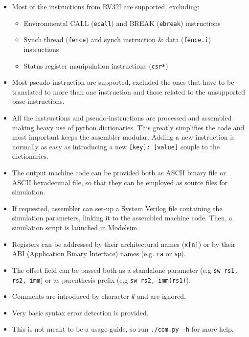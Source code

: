 \begin{itemize}
   \item Most of the instructions from RV32I are supported, excluding:
   \begin{itemize}
      \item Environmental CALL (\texttt{ecall}) and BREAK (\texttt{ebreak}) instructions
      \item Synch thread (\texttt{fence}) and synch instruction \& data (\texttt{fence.i}) instructions
      \item Status register manipulation instructions (\texttt{csr*})
   \end{itemize}
   \item Most pseudo-instruction are supported, excluded the ones that have to be translated to more than one instruction and those related to the unsupported base instructions.
   \item All the instructions and pseudo-instructions are processed and assembled making heavy use of python dictionaries. This greatly simplifies the code and most important keeps the assembler modular. Adding a new instruction is normally as easy as introducing a new \texttt{[key]: [value]} couple to the dictionaries. 
   \item The output machine code can be provided both as ASCII binary file or ASCII hexadecimal file, so that they can be employed as source files for simulation.
   \item If requested, assembler can set-up a System Verilog file containing the simulation parameters, linking it to the assembled machine code. Then, a simulation script is launched in Modelsim. 
   \item Registers can be addressed by their architectural names (\texttt{x[n]}) or by their ABI (Application Binary Interface) names (e.g. \texttt{ra} or \texttt{sp}). 
   \item The offset field can be passed both as a standalone parameter (e.g \texttt{sw rs1, rs2, imm}) or as parenthesis prefix (e.g \texttt{sw rs2, imm(rs1)}). 
   \item Comments are introduced by character \texttt{\#} and are ignored.
   \item Very basic syntax error detection is provided.
   \item This is not meant to be a usage guide, so run \texttt{./com.py -h} for more help.
\end{itemize}

